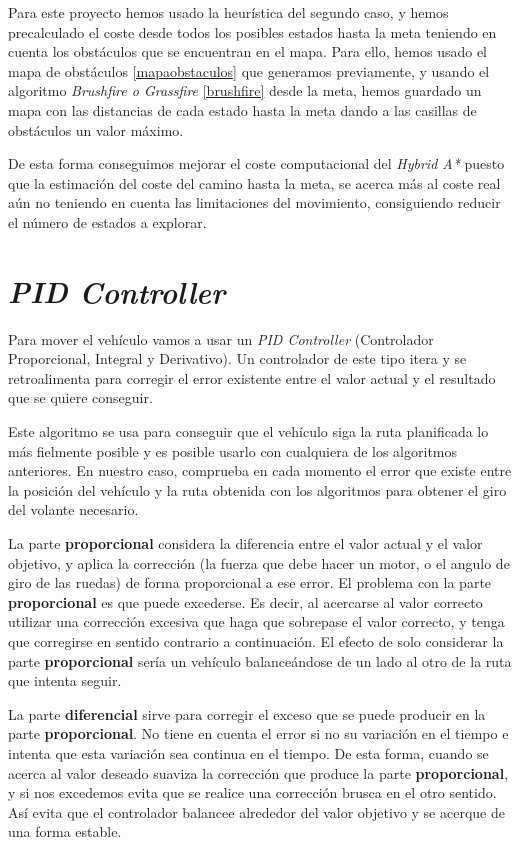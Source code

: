 Para este proyecto hemos usado la heurística del segundo caso, y hemos precalculado el coste desde todos los posibles estados hasta la meta teniendo en cuenta los obstáculos que se encuentran en el mapa. Para ello, hemos usado el mapa de obstáculos \ref{mapaobstaculos} que generamos previamente, y usando el algoritmo \textit{Brushfire o Grassfire} \ref{brushfire} desde la meta, hemos guardado un mapa con las distancias de cada estado hasta la meta dando a las casillas de obstáculos un valor máximo.

De esta forma conseguimos mejorar el coste computacional del \textit{Hybrid A*} puesto que la estimación del coste del camino hasta la meta, se acerca más al coste real aún no teniendo en cuenta las limitaciones del movimiento, consiguiendo reducir el número de estados a explorar.

\section{\textit{PID Controller}}\label{pidcontroller}
Para mover el vehículo vamos a usar un \textit{PID Controller} (Controlador Proporcional, Integral y Derivativo). Un controlador de este tipo itera y se retroalimenta para corregir el error existente entre el valor actual y el resultado que se quiere conseguir.

Este algoritmo se usa para conseguir que el vehículo siga la ruta planificada lo más fielmente posible y es posible usarlo con cualquiera de los algoritmos anteriores. En nuestro caso, comprueba en cada momento el error que existe entre la posición del vehículo y la ruta obtenida con los algoritmos para obtener el giro del volante necesario.

La parte \textbf{proporcional} considera la diferencia entre el valor actual y el valor objetivo, y aplica la corrección (la fuerza que debe hacer un motor, o el angulo de giro de las ruedas) de forma proporcional a ese error. El problema con la parte \textbf{proporcional} es que puede excederse. Es decir, al acercarse al valor correcto utilizar una corrección excesiva que haga que sobrepase el valor correcto, y tenga que corregirse en sentido contrario a continuación. El efecto de solo considerar la parte \textbf{proporcional} sería un vehículo balanceándose de un lado al otro de la ruta que intenta seguir.

La parte \textbf{diferencial} sirve para corregir el exceso que se puede producir en la parte \textbf{proporcional}. No tiene en cuenta el error si no su variación en el tiempo e intenta que esta variación sea continua en el tiempo. De esta forma, cuando se acerca al valor deseado suaviza la corrección que produce la parte \textbf{proporcional}, y si nos excedemos evita que se realice una corrección brusca en el otro sentido. Así evita que el controlador balancee alrededor del valor objetivo y se acerque de una forma estable.

